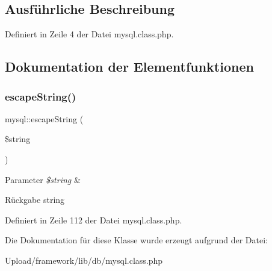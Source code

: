\subsection{Ausführliche Beschreibung}


Definiert in Zeile 4 der Datei mysql.\+class.\+php.



\subsection{Dokumentation der Elementfunktionen}
\mbox{\label{classmysql_ab9e94d076a8b18c871932961f6cdd5e7}} 
\subsubsection{\texorpdfstring{escape\+String()}{escapeString()}}
{\footnotesize\ttfamily mysql\+::escape\+String (\begin{DoxyParamCaption}\item[{}]{\$string }\end{DoxyParamCaption})}


\begin{DoxyParams}{Parameter}
{\em \$string} & \\
\hline
\end{DoxyParams}
\begin{DoxyReturn}{Rückgabe}
string 
\end{DoxyReturn}


Definiert in Zeile 112 der Datei mysql.\+class.\+php.



Die Dokumentation für diese Klasse wurde erzeugt aufgrund der Datei\+:\begin{DoxyCompactItemize}
\item 
Upload/framework/lib/db/mysql.\+class.\+php\end{DoxyCompactItemize}
